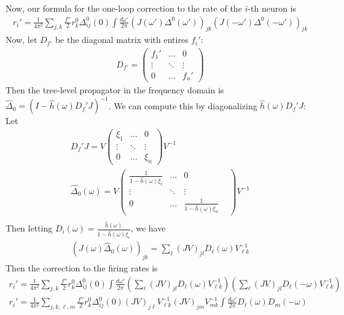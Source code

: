 \documentclass [12pt]{amsart}
\theoremstyle{definition}
\newcommand{\inv}{^{-1}}
\begin{document}
Now, our formula for the one-loop correction to the rate of the $i$-th neuron is 
\begin{align*}
r_i' =  \frac{1}{4\pi^2}\sum_{j,k} \frac{f''}{2} r_k^0\Delta_{ij}^0(0)\int \frac{d\omega'}{2\pi} \left(J(\omega')\Delta^0(\omega')\right)_{jk} \left(J(-\omega') \Delta^0(-\omega')\right)_{jk}
\end{align*}
Now, let $D_{f'}$ be the diagonal matrix with entires $f_i'$:
\begin{align*}
D_{f'} = \begin{pmatrix}
f_1' & \ldots & 0\\
\vdots & \ddots & \vdots\\
0 & \ldots  & f_n'
\end{pmatrix}
\end{align*}
Then the tree-level propagator in the frequency domain is 
$\hat \Delta_0 = (I - \hat h(\omega) D_f' J)\inv$. 
We can compute this by diagonalizing $\hat h(\omega) D_f' J$:  
Let 
\begin{align*}
D_f' J = V \begin{pmatrix}
\xi_1 & \ldots & 0\\
\vdots & \ddots & \vdots\\
0 & \ldots  & \xi_n
\end{pmatrix}V\inv\\
\hat \Delta_0(\omega) = V
\begin{pmatrix}
\frac{1}{1 - \hat h(\omega) \xi_i}& \ldots & 0\\
\vdots & \ddots & \vdots\\
0 & \ldots  & \frac{1}{1 - \hat h(\omega) \xi_n}&
\end{pmatrix}V\inv\\
\end{align*}
Then letting $D_{i}(\omega) = \frac{\hat h (\omega)}{1 - \hat h(\omega) \xi_i}$, we have 
\begin{align*}
(J(\omega) \hat \Delta_0(\omega))_{jk} = \sum_{\ell}(J V)_{jl} D_\ell(\omega) V_{\ell k }\inv
\end{align*}
Then the correction to the firing rates is 
\begin{align*}
r_i' =  \frac{1}{4\pi^2}\sum_{j,k} \frac{f''}{2} r_k^0\Delta_{ij}^0(0)\int \frac{d\omega'}{2\pi} \left(\sum_{\ell}(J V)_{jl} D_\ell(\omega) V_{\ell k }\inv\right) \left(\sum_{\ell}(J V)_{jl} D_\ell(-\omega) V_{\ell k }\inv\right)\\
r_i' =  \frac{1}{4\pi^2}\sum_{j,k, \ell, m} \frac{f''}{2} r_k^0\Delta_{ij}^0(0) (J V)_{j\ell} V_{\ell k }\inv (J V)_{jm}  V_{m k }\inv \int \frac{d\omega'}{2\pi} D_\ell(\omega)D_m(-\omega)
\end{align*}
\end{document}
